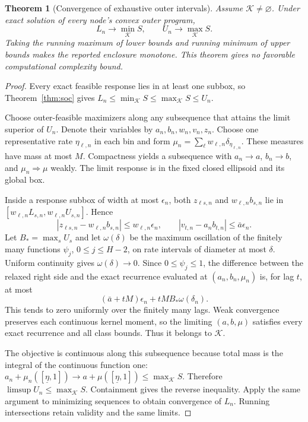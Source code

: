 \documentclass[11pt,a4paper]{article}
\newtheorem{theorem}{Theorem}[section]
\theoremstyle{definition}\newtheorem{definition}[theorem]{Definition}
\theoremstyle{remark}\newtheorem{remark}[theorem]{Remark}
\newcommand{\mc}{\mathcal}
\begin{document}
\begin{theorem}[Convergence of exhaustive outer intervals]\label{thm:converge}
Assume $\mc K\ne\varnothing$. Under exact solution of every node's convex outer program,
\[
 L_n\longrightarrow\min_{\mc K}S,
 \qquad U_n\longrightarrow\max_{\mc K}S.
\]
Taking the running maximum of lower bounds and running minimum of upper bounds makes the reported enclosure monotone. This theorem gives no favorable computational complexity bound.
\end{theorem}
\begin{proof}
Every exact feasible response lies in at least one subbox, so Theorem~\ref{thm:soc} gives
$L_n\le\min_{\mc K}S\le\max_{\mc K}S\le U_n$.

Choose outer-feasible maximizers along any subsequence that attains the limit superior of $U_n$. Denote their variables by $a_n,b_n,w_n,v_n,z_n$. Choose one representative rate $\eta_{\ell,n}$ in each bin and form
$\mu_n=\sum_\ell w_{\ell,n}\delta_{\eta_{\ell,n}}$. These measures have mass at most $M$. Compactness yields a subsequence with
$a_n\to a$, $b_n\to b$, and $\mu_n\Rightarrow\mu$ weakly. The limit response is in the fixed closed ellipsoid and its global box.

Inside a response subbox of width at most $\epsilon_n$, both $z_{\ell s,n}$ and $w_{\ell,n}b_{s,n}$ lie in
$[w_{\ell,n}L_{s,n},w_{\ell,n}U_{s,n}]$. Hence
\[
 |z_{\ell s,n}-w_{\ell,n}b_{s,n}|\le w_{\ell,n}\epsilon_n,
 \qquad |v_{t,n}-a_nb_{t,n}|\le\bar a\epsilon_n.
\]
Let $B_* =\max_sU_s$ and let
$\omega(\delta)$ be the maximum oscillation of the finitely many functions $\psi_j$, $0\le j\le H-2$, on rate intervals of diameter at most $\delta$. Uniform continuity gives $\omega(\delta)\to0$. Since $0\le\psi_j\le1$, the difference between the relaxed right side and the exact recurrence evaluated at $(a_n,b_n,\mu_n)$ is, for lag $t$, at most
\[
 (\bar a+tM)\epsilon_n+tMB_*\omega(\delta_n).
\]
This tends to zero uniformly over the finitely many lags. Weak convergence preserves each continuous kernel moment, so the limiting $(a,b,\mu)$ satisfies every exact recurrence and all class bounds. Thus it belongs to $\mc K$.

The objective is continuous along this subsequence because total mass is the integral of the continuous function one:
$a_n+\mu_n([\underline\eta,1])\to a+\mu([\underline\eta,1])\le\max_{\mc K}S$.
Therefore $\limsup U_n\le\max_{\mc K}S$. Containment gives the reverse inequality. Apply the same argument to minimizing sequences to obtain convergence of $L_n$. Running intersections retain validity and the same limits.
\end{proof}
\end{document}
